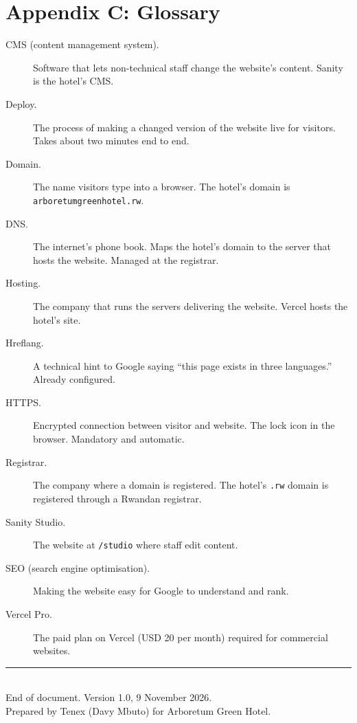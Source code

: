 \documentclass[11pt,a4paper]{article}
\begin{document}
\section*{Appendix C: Glossary}

\begin{description}
\item[CMS (content management system).] Software that lets non-technical staff change the website's content. Sanity is the hotel's CMS.
\item[Deploy.] The process of making a changed version of the website live for visitors. Takes about two minutes end to end.
\item[Domain.] The name visitors type into a browser. The hotel's domain is \texttt{arboretumgreenhotel.\allowbreak rw}.
\item[DNS.] The internet's phone book. Maps the hotel's domain to the server that hosts the website. Managed at the registrar.
\item[Hosting.] The company that runs the servers delivering the website. Vercel hosts the hotel's site.
\item[Hreflang.] A technical hint to Google saying ``this page exists in three languages.'' Already configured.
\item[HTTPS.] Encrypted connection between visitor and website. The lock icon in the browser. Mandatory and automatic.
\item[Registrar.] The company where a domain is registered. The hotel's \texttt{.rw} domain is registered through a Rwandan registrar.
\item[Sanity Studio.] The website at \texttt{/studio} where staff edit content.
\item[SEO (search engine optimisation).] Making the website easy for Google to understand and rank.
\item[Vercel Pro.] The paid plan on Vercel (USD 20 per month) required for commercial websites.
\end{description}

\vspace{2cm}

\begin{center}
\color{ink600}
\rule{10cm}{0.3pt}\\[0.4em]
\small End of document. Version 1.0, 9 November 2026.\\
Prepared by Tenex (Davy Mbuto) for Arboretum Green Hotel.
\end{center}
\end{document}

